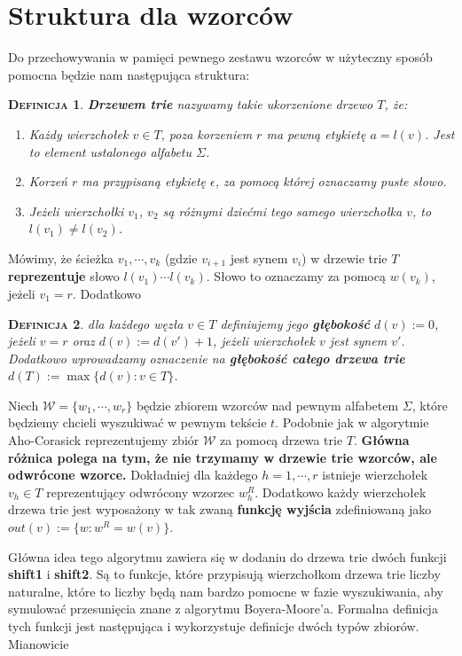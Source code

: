 \documentclass[a4paper,11pt]{article}
\newtheorem{DEF}{\textsc{Definicja}}[section]
\begin{document}
\section{Struktura dla wzorców}
Do przechowywania w pamięci pewnego zestawu wzorców w użyteczny sposób pomocna będzie nam następująca struktura:

\begin{DEF}
\textbf{Drzewem trie} nazywamy takie ukorzenione drzewo $T$, że:
\begin{enumerate}
    \item Każdy wierzchołek $v \in T$, poza korzeniem $r$ ma pewną etykietę $a = l(v)$. Jest to element ustalonego alfabetu $\Sigma$.
    \item Korzeń $r$ ma przypisaną etykietę $\epsilon$, za pomocą której oznaczamy puste słowo.
    \item Jeżeli wierzchołki $v_1$, $v_2$ są różnymi dziećmi tego samego wierzchołka $v$, to $l(v_1) \not = l(v_2)$.
\end{enumerate}
\end{DEF}

\noindent Mówimy, że ścieżka $v_1, \cdots, v_k$ (gdzie $v_{i+1}$ jest synem $v_i$) w drzewie trie $T$ \textbf{reprezentuje} słowo $l(v_1)\cdots l(v_k)$. Słowo to oznaczamy za pomocą $w(v_k)$, jeżeli $v_1 = r$. Dodatkowo 

\begin{DEF}
dla każdego węzła $v\in T$ definiujemy jego \textbf{głębokość} $d(v) := 0$, jeżeli $v=r$ oraz $d(v) := d(v') + 1$, jeżeli wierzchołek $v$ jest synem $v'$.
Dodatkowo wprowadzamy oznaczenie na \textbf{głębokość całego drzewa trie} $d(T) := \max \{ d(v) : v \in T\}$.
\end{DEF}

Niech $\mathcal{W} = \{ w_1, \cdots, w_r\}$ będzie zbiorem wzorców nad pewnym alfabetem $\Sigma$, które będziemy chcieli wyszukiwać w pewnym tekście $t$. Podobnie jak w algorytmie Aho-Corasick reprezentujemy zbiór $\mathcal{W}$ za pomocą drzewa trie $T$. \textbf{Główna różnica polega na tym, że nie trzymamy w drzewie trie wzorców, ale odwrócone wzorce.} Dokładniej dla każdego $h = 1,\cdots, r$ istnieje wierzchołek $v_h \in T$ reprezentujący odwrócony wzorzec $w_h^R$. Dodatkowo każdy wierzchołek drzewa trie jest wyposażony w tak zwaną \textbf{funkcję wyjścia} zdefiniowaną jako $out(v) := \{ w : w^R = w(v)\}$. 

Główna idea tego algorytmu zawiera się w dodaniu do drzewa trie dwóch funkcji \textbf{shift1} i \textbf{shift2}. Są to funkcje, które przypisują wierzchołkom drzewa trie liczby naturalne, które to liczby będą nam bardzo pomocne w fazie wyszukiwania, aby symulować przesunięcia znane z algorytmu Boyera-Moore'a. Formalna definicja tych funkcji jest następująca i wykorzystuje definicje dwóch typów zbiorów. Mianowicie 
\end{document}
